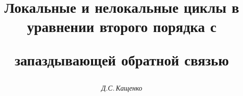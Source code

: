 




%





\newcommand{\const}{\operatorname{const}}


\newcommand{\re}{\operatorname{Re}}


\newcommand{\im}{\operatorname{Im}}




\newcommand{\tts}[1]{}







 


\setcounter{page}{12}















\author{\it Д.С.\,Кащенко}




\title{Локальные и нелокальные циклы в уравнении второго порядка с


запаздывающей обратной связью}





\date{}




\pagestyle{plain} %







